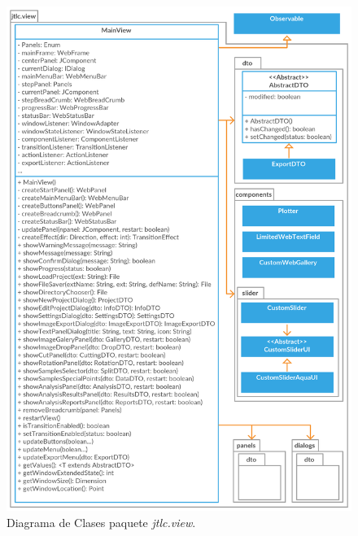 \begin{figure}[H]
	\centering
	\vspace{-2.5cm}
	\includegraphics[width=425pt]{imagenes-jtlc/view}
	\centering
	\vspace{-1.0cm}
	\caption{Diagrama de Clases paquete \textit{jtlc.view}.}
	\label{fig:viewDiagrama}
\end{figure}

